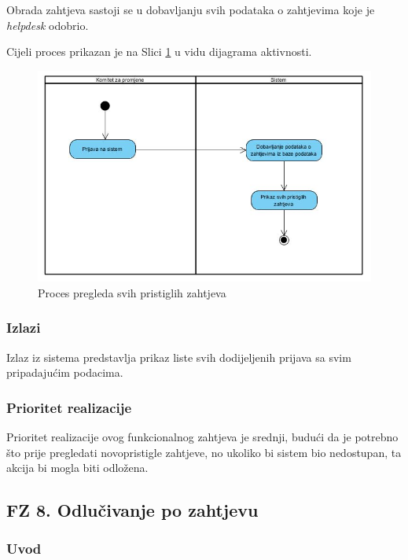 \documentclass[12pt,a4paper]{article}
\begin{document}
Obrada zahtjeva sastoji se u dobavljanju svih podataka o zahtjevima koje je \textit{helpdesk} odobrio.

Cijeli proces prikazan je na Slici \ref{act7} u vidu dijagrama aktivnosti.

\begin{figure}[H]
\center
\includegraphics[scale=0.5]{../res/Activity/activity7.JPG}
\caption{Proces pregleda svih pristiglih zahtjeva}
\label{act7}
\end{figure}

\subsubsection{Izlazi}

Izlaz iz sistema predstavlja prikaz liste svih dodijeljenih prijava sa svim pripadajućim podacima.

\subsubsection{Prioritet realizacije}

Prioritet realizacije ovog funkcionalnog zahtjeva je srednji, budući da je potrebno što prije pregledati novopristigle zahtjeve, no ukoliko bi sistem bio nedostupan, ta akcija bi mogla biti odložena.

\subsection{FZ 8. Odlučivanje po zahtjevu}

\subsubsection{Uvod}
\end{document}
